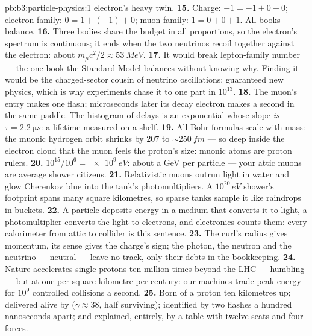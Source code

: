 \begin{solution}{pb:b3:particle-physics:1}
electron's heavy twin.
\textbf{15.} Charge: $-1 = -1 + 0 + 0$; electron-family:
$0 = 1 + (-1) + 0$; muon-family: $1 = 0 + 0 + 1$. All books
balance.
\textbf{16.} Three bodies share the budget in all proportions,
so the electron's spectrum is continuous; it ends when the two
neutrinos recoil together against the electron: about
$m_\mu c^2/2 \approx \qty{53}{MeV}$.
\textbf{17.} It would break lepton-family number --- the one
book the Standard Model balances without knowing why. Finding
it would be the charged-sector cousin of neutrino oscillations:
guaranteed new physics, which is why experiments chase it to
one part in $10^{13}$.
\textbf{18.} The muon's entry makes one flash; microseconds
later its decay electron makes a second in the same paddle. The
histogram of delays is an exponential whose slope \emph{is}
$\tau = \qty{2.2}{\micro s}$: a lifetime measured on a shelf.
\textbf{19.} All Bohr formulas scale with mass: the muonic
hydrogen orbit shrinks by $207$ to ${\sim}\qty{250}{fm}$ ---
so deep inside the electron cloud that the muon feels the
proton's size: muonic atoms are proton rulers.
\textbf{20.} $10^{15}/10^{6} = \qty{e9}{eV}$: about a GeV per
particle --- your attic muons are average shower citizens.
\textbf{21.} Relativistic muons outrun light in water and glow
Cherenkov blue into the tank's photomultipliers. A
$10^{20}\,\unit{eV}$ shower's footprint spans many square
kilometres, so sparse tanks sample it like raindrops in
buckets.
\textbf{22.} A particle deposits energy in a medium that
converts it to light, a photomultiplier converts the light to
electrons, and electronics counts them: every calorimeter from
attic to collider is this sentence.
\textbf{23.} The curl's radius gives momentum, its sense gives
the charge's sign; the photon, the neutron and the neutrino ---
neutral --- leave no track, only their debts in the
bookkeeping.
\textbf{24.} Nature accelerates single protons ten million
times beyond the LHC --- humbling --- but at one per square
kilometre per century: our machines trade peak energy for
$10^{9}$ controlled collisions a second.
\textbf{25.} Born of a proton ten kilometres up; delivered
alive by  ($\gamma \approx 38$, half surviving);
identified by two flashes a hundred nanoseconds apart; and
explained, entirely, by a table with twelve seats and four
forces.
\end{solution}
